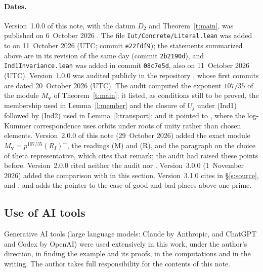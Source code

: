 \documentclass[11pt]{amsart}
\theoremstyle{remark}
\newcommand{\RIt}{(R_I)^{\sim}}
\newcommand{\bv}{\mathbf v}
\begin{document}
\paragraph{Dates.}
Version~1.0.0 of this note, with the datum $D_2$ and Theorem~\ref{t:main}, was published on 6~October 2026
\cite{NoteV1}. The file \texttt{Iut/Concrete/Literal.lean} was added to \cite{LANAiut} on 11~October 2026
(UTC; commit \texttt{e22fdf9}); the statements summarized above are in its revision of the same day (commit
\texttt{2b2190d}), and \texttt{Ind1Invariance.lean} was added in commit \texttt{08c7e5d}, also on 11~October
2026 (UTC). Version~1.0.0 was audited publicly in the repository \cite{Lumi}, whose first commits are dated
20~October 2026 (UTC). The audit computed the exponent $107/35$ of the module $M_{\bv}$ of
Theorem~\ref{t:main}; it listed, as conditions still to be proved, the membership used in
Lemma~\ref{l:member} and the closure of $U_j$ under (Ind1) followed by (Ind2) used in
Lemma~\ref{l:transport}; and it pointed to \cite[Rem.~3.11.4(i)]{IUT3}, where the log-Kummer correspondence
uses orbits under roots of unity rather than chosen elements. Version~2.0.0 of this note (29~October 2026) added
the exact module $M_{\bv}=p^{107/35}\RIt$, the readings \textup{(M)} and \textup{(R)}, and the paragraph on the
choice of theta representative, which cites that remark; the audit had raised these points before. Version~2.0.0
cited neither the audit nor \cite{LANAiut}. Version~3.0.0 (1~November 2026) added the comparison with
\cite{LANAiut} in this section. Version~3.1.0 cites \cite{Takkun} in \S\ref{s:source}, \cite{Lumi} and
\cite{Zeng}, and adds the pointer to the case of good and bad places above one prime.

\subsection*{Use of AI tools}
Generative AI tools (large language models: \mbox{Claude} by \mbox{Anthropic}, and \mbox{ChatGPT} and \mbox{Codex} by \mbox{OpenAI}) were used
extensively in this work, under the author's direction, in
finding the example and its proofs, in the computations and in the writing. The author takes full responsibility for
the contents of this note.
\end{document}
